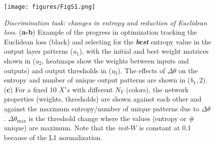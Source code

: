 \begin{figure}[H]
    \centering
    \texttt{[image: figures/FigS1.png]}
    \caption{
    \textit{Discrimination task: changes in entropy and reduction of Euclidean loss}.
    (\textbf{a-b})
        Example of the progress in optimization tracking the Euclidean loss (black)
        and selecting for the \textbf{\textit{best}} entropy value in the output layer patterns (\textit{a}$_1$),
        with the initial and best weight matrices shown in
            (\textit{a}$_2$, heatmaps show the weights between inputs and outputs)
        and output thresholds in (\textit{a}$_3$).
        The effects of $\Delta \theta$ on the entropy
            and number of unique output patterns are shown in (\textit{b}$_1,2$).
    (\textbf{c}) For a fixed 10 $X's$ with different $N_Y$ (colors),
        the network properties (weights, thresholds) are shown against each other
            and against the maximum entropy/number of unique patterns
            due to $\Delta \theta$.
        $\Delta \theta_{\mathrm{max}}$ is the threshold change
            where the values (entropy or \# unique) are maximum.
        Note that the \textit{init}-$W$ is constant at 0.1
            because of the L1 normalization.
    }
    \label{supp:demo-discrim}
\end{figure}

